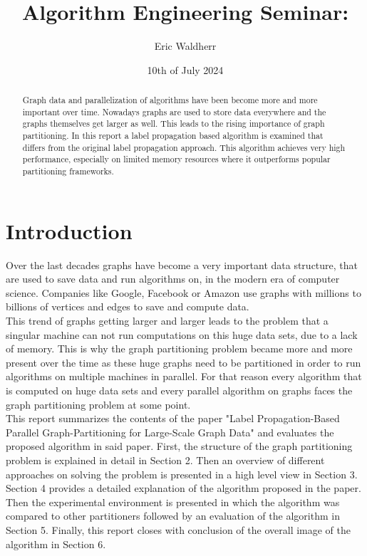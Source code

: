 \documentclass[acmsmall,nonacm,screen,review]{acmart}
\title{Algorithm Engineering Seminar: }
\author{Eric Waldherr}
\affiliation{%
  \institution{Heidelberg University}
  \streetaddress{Im Neuenheimer Feld 205}
  \city{Heidelberg}
  \state{Baden-Württemberg}
  \country{Germany}
  \postcode{69120}
}
\date{10th of July 2024}
\begin{document}
\begin{abstract}
Graph data and parallelization of algorithms have been become more and more important over time. Nowadays graphs are used to store data everywhere and the graphs themselves get larger as well. This leads to the rising importance of graph partitioning. In this report a label propagation based algorithm is examined that differs from the original label propagation approach. This algorithm achieves very high performance, especially on limited memory resources where it outperforms popular partitioning frameworks.
\end{abstract}
\maketitle

\section{Introduction}
Over the last decades graphs have become a very important data structure, that are used to save data
and run algorithms on, in the modern era of computer science. Companies like Google, Facebook or Amazon use graphs with millions to billions of vertices and edges to save and compute data.\\ 
This trend of graphs getting larger and larger leads to the problem that a singular machine can not run computations on this huge data sets, due to a lack of memory. This is why the graph partitioning problem became more and more present over the time as these huge graphs need to be partitioned in order to run algorithms on multiple machines in parallel. For that reason every algorithm that is computed on huge data sets and every parallel algorithm on graphs faces the graph partitioning problem at some point.\\ 
This report summarizes the contents of the paper "Label Propagation-Based Parallel Graph-Partitioning for Large-Scale Graph Data" and evaluates the proposed algorithm in said paper. First, the structure of the graph partitioning problem is explained in detail in Section 2. Then an overview of different approaches on solving the problem is presented in a high level view in Section 3. Section 4 provides a detailed explanation of the algorithm proposed in the paper. Then the experimental environment is presented in which the algorithm was compared to other partitioners followed by an evaluation of the algorithm in Section 5. Finally, this report closes with conclusion of the overall image of the algorithm in Section 6.
\end{document}
